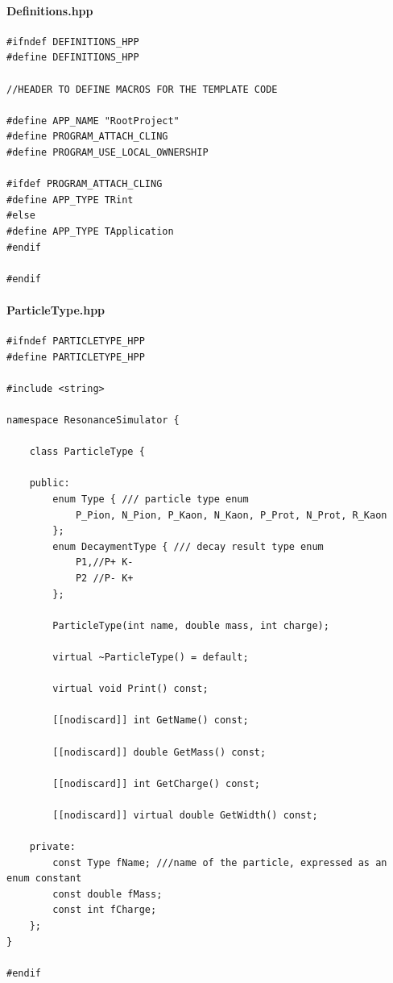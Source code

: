 \documentclass[12pt, a4paper]{article}
\begin{document}
\paragraph{Definitions.hpp}
\begin{verbatim}
#ifndef DEFINITIONS_HPP
#define DEFINITIONS_HPP

//HEADER TO DEFINE MACROS FOR THE TEMPLATE CODE

#define APP_NAME "RootProject"
#define PROGRAM_ATTACH_CLING
#define PROGRAM_USE_LOCAL_OWNERSHIP

#ifdef PROGRAM_ATTACH_CLING
#define APP_TYPE TRint
#else
#define APP_TYPE TApplication
#endif

#endif
\end{verbatim}

\paragraph{ParticleType.hpp}

\begin{verbatim}
#ifndef PARTICLETYPE_HPP
#define PARTICLETYPE_HPP

#include <string>

namespace ResonanceSimulator {

    class ParticleType {

    public:
        enum Type { /// particle type enum
            P_Pion, N_Pion, P_Kaon, N_Kaon, P_Prot, N_Prot, R_Kaon
        };
        enum DecaymentType { /// decay result type enum
            P1,//P+ K-
            P2 //P- K+
        };

        ParticleType(int name, double mass, int charge);

        virtual ~ParticleType() = default;

        virtual void Print() const;

        [[nodiscard]] int GetName() const;

        [[nodiscard]] double GetMass() const;

        [[nodiscard]] int GetCharge() const;

        [[nodiscard]] virtual double GetWidth() const;

    private:
        const Type fName; ///name of the particle, expressed as an enum constant
        const double fMass;
        const int fCharge;
    };
}

#endif


\end{verbatim}
\end{document}
